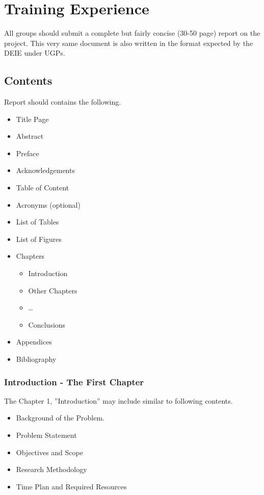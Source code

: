 \chapter{Training Experience}\label{cha:report}

All groups should submit a complete but fairly concise (30-50 page) report on the project. This very same document is also written in the format expected by the DEIE under UGPs.

\section{Contents}\label{sec:report-contetns}

Report should contains the following.
\begin{itemize}
	\item Title Page
	\item Abstract
	\item Preface
	\item Acknowledgements
	\item Table of Content
	\item Acronyms (optional)
	\item List of Tables
	\item List of Figures
	\item Chapters
		\begin{itemize}
			\item Introduction
			\item Other Chapters
			\item \ldots
			\item Conclusions
		\end{itemize}
	\item Appendices
	\item Bibliography
\end{itemize}

\subsection{Introduction - The First Chapter}
The Chapter 1, ''Introduction''  may include similar to following contents.
\begin{itemize}
	\item Background of the Problem.
	\item Problem Statement
	\item Objectives and Scope
	\item Research Methodology
	\item Time Plan and Required Resources
\end{itemize}


